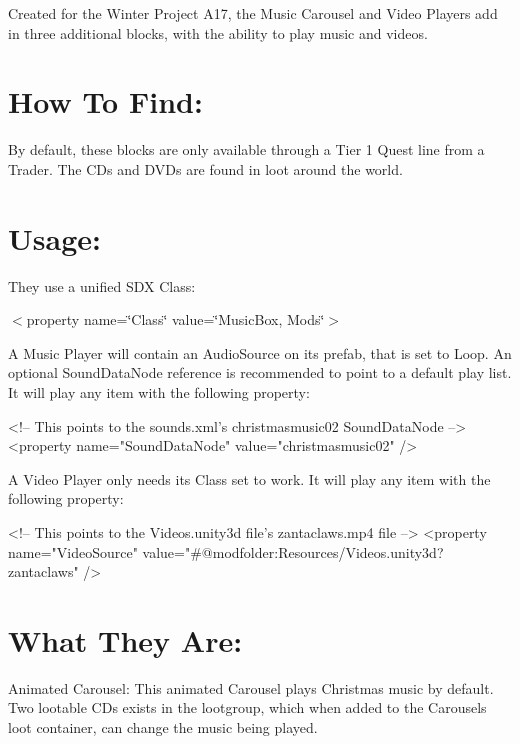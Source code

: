 Created for the Winter Project A17, the Music Carousel and Video Players add in three additional blocks, with the ability to play music and videos.\hypertarget{md__c_1__users_jkilpatrick__documents__git_hub__sphere_i_i_8_mods__sphere_i_i__music__boxes__r_e_a_d_m_e_autotoc_md19}{}\section{How To Find\+:}\label{md__c_1__users_jkilpatrick__documents__git_hub__sphere_i_i_8_mods__sphere_i_i__music__boxes__r_e_a_d_m_e_autotoc_md19}
By default, these blocks are only available through a Tier 1 Quest line from a Trader. The C\+Ds and D\+V\+Ds are found in loot around the world.\hypertarget{md__c_1__users_jkilpatrick__documents__git_hub__sphere_i_i_8_mods__sphere_i_i__music__boxes__r_e_a_d_m_e_autotoc_md20}{}\section{Usage\+:}\label{md__c_1__users_jkilpatrick__documents__git_hub__sphere_i_i_8_mods__sphere_i_i__music__boxes__r_e_a_d_m_e_autotoc_md20}
They use a unified S\+DX Class\+:

$<$property name=\char`\"{}\+Class\char`\"{} value=\char`\"{}\+Music\+Box, Mods\char`\"{}$>$

A Music Player will contain an Audio\+Source on its prefab, that is set to Loop. An optional Sound\+Data\+Node reference is recommended to point to a default play list. It will play any item with the following property\+: \begin{DoxyVerb}<!-- This points to the sounds.xml's christmasmusic02 SoundDataNode -->
<property name="SoundDataNode" value="christmasmusic02" />
\end{DoxyVerb}


A Video Player only needs it\textquotesingle{}s Class set to work. It will play any item with the following property\+: \begin{DoxyVerb}<!-- This points to the Videos.unity3d file's zantaclaws.mp4 file -->
<property name="VideoSource" value="#@modfolder:Resources/Videos.unity3d?zantaclaws" />
\end{DoxyVerb}
\hypertarget{md__c_1__users_jkilpatrick__documents__git_hub__sphere_i_i_8_mods__sphere_i_i__music__boxes__r_e_a_d_m_e_autotoc_md21}{}\section{What They Are\+:}\label{md__c_1__users_jkilpatrick__documents__git_hub__sphere_i_i_8_mods__sphere_i_i__music__boxes__r_e_a_d_m_e_autotoc_md21}
Animated Carousel\+: This animated Carousel plays Christmas music by default. Two lootable C\+Ds exists in the lootgroup, which when added to the Carousel\textquotesingle{}s loot container, can change the music being played.

